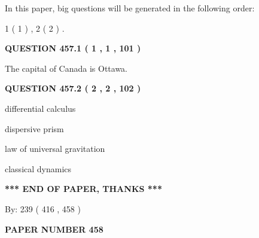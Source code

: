 \documentclass[12pt]{article}
\begin{document}
   
   
   
   
\vspace{0.2in}
   
In this paper, big questions will be generated in the following order: 
   
   
   1 ( 1 )
 ,
   2 ( 2 )
 .
  
\vspace{0.2in}
  
{\textbf{\Large{QUESTION
457.1 
 ( 1 , 1 , 101 )
}}}
  
  
 
 
\noindent{}
 
 
The capital of Canada is Ottawa.
 
 
 
 
  
\vspace{0.2in}
  
{\textbf{\Large{QUESTION
457.2 
 ( 2 , 2 , 102 )
}}}
  
  
 
 
\noindent{}
 
 
differential calculus
 
 
dispersive prism
 
 
law of universal gravitation
 
 
classical dynamics
 
 
 
 
   
   
\vspace{1.0in} 
{\textbf{\large{ *** END OF PAPER, THANKS *** }}} 
   
   
\hspace{1.0in} By: 
 239 ( 416 ,  458 )
   
   
   
   
\newpage 
\setcounter{page}{ 
   458001 } 
   
   
   
   
 {\textbf{ \Large{ PAPER NUMBER  458  }}}
   
   
\vspace{0.2in}
   
\end{document}
